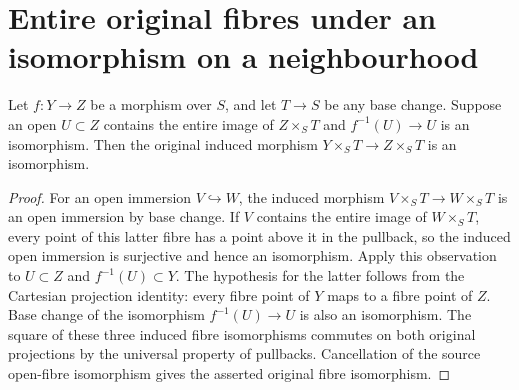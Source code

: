 \section{Entire original fibres under an isomorphism on a neighbourhood}

\begin{lemma}
\label{lem:pl-original-fibre-map-neighbourhood-isomorphism}
\leanok
Let $f:Y\to Z$ be a morphism over $S$, and let $T\to S$ be any base change.
Suppose an open $U\subset Z$ contains the entire image of $Z\times_S T$ and
$f^{-1}(U)\to U$ is an isomorphism. Then the original induced morphism
$Y\times_S T\to Z\times_S T$ is an isomorphism.
\end{lemma}
\begin{proof}
For an open immersion $V\hookrightarrow W$, the induced morphism
$V\times_S T\to W\times_S T$ is an open immersion by base change. If $V$
contains the entire image of $W\times_S T$, every point of this latter fibre
has a point above it in the pullback, so the induced open immersion is
surjective and hence an isomorphism. Apply this observation to $U\subset Z$
and $f^{-1}(U)\subset Y$. The hypothesis for the latter follows from the
Cartesian projection identity: every fibre point of $Y$ maps to a fibre point
of $Z$. Base change of the isomorphism $f^{-1}(U)\to U$ is also an
isomorphism. The square of these three induced fibre isomorphisms commutes
on both original projections by the universal property of pullbacks.
Cancellation of the source open-fibre isomorphism gives the asserted original
fibre isomorphism.
\end{proof}
